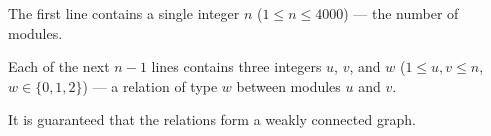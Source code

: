 The first line contains a single integer $n$ ($1 \le n \le 4000$) --- the number of modules.

Each of the next $n - 1$ lines contains three integers $u$, $v$, and $w$ ($1 \le u, v \le n$, $w \in \{0, 1, 2\}$) --- a relation of type $w$ between modules $u$ and $v$.

It is guaranteed that the relations form a weakly connected graph.

